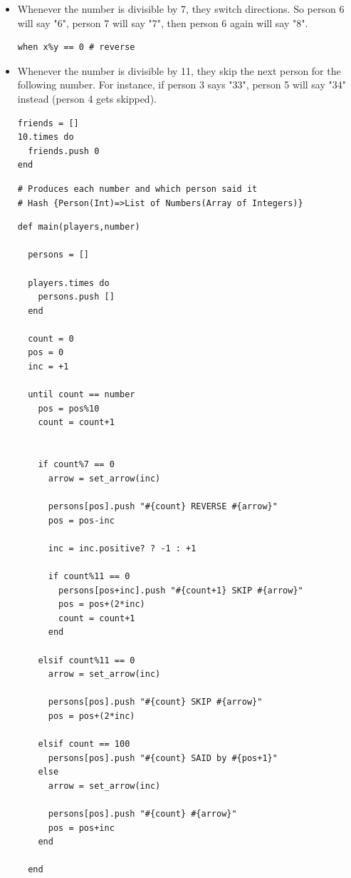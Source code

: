 \documentclass[11pt]{article}
\begin{document}
\begin{itemize}
\item Whenever the number is divisible by 7, they switch directions. So person 6 
will say "6", person 7 will say "7", then person 6 again will say "8".

\begin{verbatim}
when x%y == 0 # reverse
\end{verbatim}

\item Whenever the number is divisible by 11, they skip the next person for the 
following number. For instance, if person 3 says "33", person 5 will say 
"34" instead (person 4 gets skipped).

\begin{verbatim}
friends = []
10.times do 
  friends.push 0
end
\end{verbatim}

\begin{verbatim}
# Produces each number and which person said it
# Hash {Person(Int)=>List of Numbers(Array of Integers)}
\end{verbatim}

\begin{verbatim}
def main(players,number)

  persons = []

  players.times do
    persons.push []
  end

  count = 0
  pos = 0
  inc = +1

  until count == number
    pos = pos%10
    count = count+1


    if count%7 == 0
      arrow = set_arrow(inc)

      persons[pos].push "#{count} REVERSE #{arrow}"
      pos = pos-inc

      inc = inc.positive? ? -1 : +1

      if count%11 == 0
        persons[pos+inc].push "#{count+1} SKIP #{arrow}"
        pos = pos+(2*inc)
        count = count+1
      end

    elsif count%11 == 0
      arrow = set_arrow(inc)

      persons[pos].push "#{count} SKIP #{arrow}"
      pos = pos+(2*inc)

    elsif count == 100
      persons[pos].push "#{count} SAID by #{pos+1}"
    else
      arrow = set_arrow(inc)

      persons[pos].push "#{count} #{arrow}"
      pos = pos+inc
    end

  end


\end{verbatim}
\end{itemize}
\end{document}
